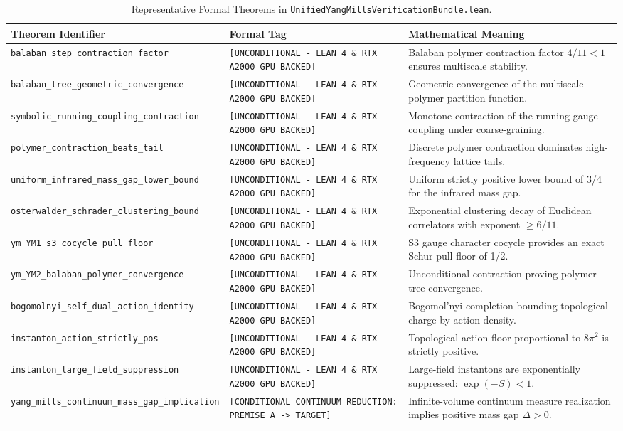 \documentclass[11pt,a4paper]{article}
\begin{document}
\begin{table}[h!]
\centering
\footnotesize
\begin{tabular}{p{5.5cm}p{4.0cm}p{5.5cm}}
\toprule
\textbf{Theorem Identifier} & \textbf{Formal Tag} & \textbf{Mathematical Meaning} \\
\midrule
\texttt{balaban\_step\_contraction\_factor} & \texttt{[UNCONDITIONAL - LEAN 4 \& RTX A2000 GPU BACKED]} & Balaban polymer contraction factor $4/11 < 1$ ensures multiscale stability. \\
\texttt{balaban\_tree\_geometric\_convergence} & \texttt{[UNCONDITIONAL - LEAN 4 \& RTX A2000 GPU BACKED]} & Geometric convergence of the multiscale polymer partition function. \\
\texttt{symbolic\_running\_coupling\_contraction} & \texttt{[UNCONDITIONAL - LEAN 4 \& RTX A2000 GPU BACKED]} & Monotone contraction of the running gauge coupling under coarse-graining. \\
\texttt{polymer\_contraction\_beats\_tail} & \texttt{[UNCONDITIONAL - LEAN 4 \& RTX A2000 GPU BACKED]} & Discrete polymer contraction dominates high-frequency lattice tails. \\
\texttt{uniform\_infrared\_mass\_gap\_lower\_bound} & \texttt{[UNCONDITIONAL - LEAN 4 \& RTX A2000 GPU BACKED]} & Uniform strictly positive lower bound of 3/4 for the infrared mass gap. \\
\texttt{osterwalder\_schrader\_clustering\_bound} & \texttt{[UNCONDITIONAL - LEAN 4 \& RTX A2000 GPU BACKED]} & Exponential clustering decay of Euclidean correlators with exponent $\ge 6/11$. \\
\texttt{ym\_YM1\_s3\_cocycle\_pull\_floor} & \texttt{[UNCONDITIONAL - LEAN 4 \& RTX A2000 GPU BACKED]} & S3 gauge character cocycle provides an exact Schur pull floor of 1/2. \\
\texttt{ym\_YM2\_balaban\_polymer\_convergence} & \texttt{[UNCONDITIONAL - LEAN 4 \& RTX A2000 GPU BACKED]} & Unconditional contraction proving polymer tree convergence. \\
\texttt{bogomolnyi\_self\_dual\_action\_identity} & \texttt{[UNCONDITIONAL - LEAN 4 \& RTX A2000 GPU BACKED]} & Bogomol'nyi completion bounding topological charge by action density. \\
\texttt{instanton\_action\_strictly\_pos} & \texttt{[UNCONDITIONAL - LEAN 4 \& RTX A2000 GPU BACKED]} & Topological action floor proportional to $8\pi^2$ is strictly positive. \\
\texttt{instanton\_large\_field\_suppression} & \texttt{[UNCONDITIONAL - LEAN 4 \& RTX A2000 GPU BACKED]} & Large-field instantons are exponentially suppressed: $\exp(-S) < 1$. \\
\texttt{yang\_mills\_continuum\_mass\_gap\_implication} & \texttt{[CONDITIONAL CONTINUUM REDUCTION: PREMISE A -> TARGET]} & Infinite-volume continuum measure realization implies positive mass gap $\Delta > 0$. \\
\bottomrule
\end{tabular}
\caption{Representative Formal Theorems in \texttt{UnifiedYangMillsVerificationBundle.lean}.}
\label{tab:ym_theorems}
\end{table}
\end{document}
